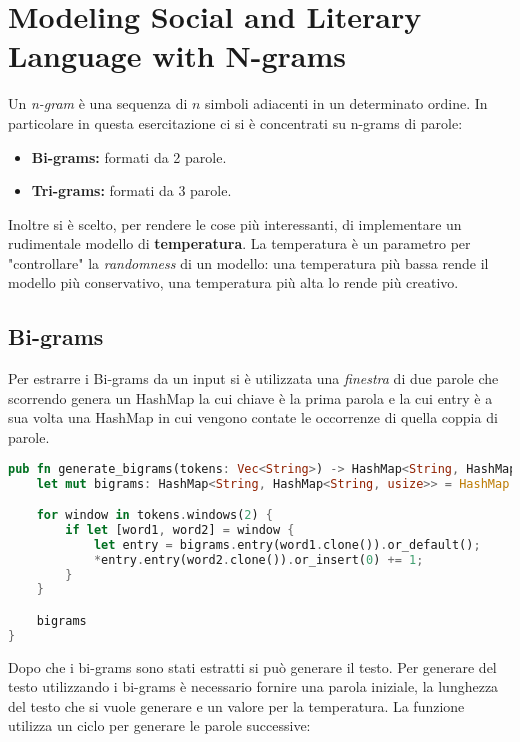 \chapter{Modeling Social and Literary Language with N-grams}

Un \textit{n-gram} è una sequenza di $n$ simboli adiacenti in un determinato ordine. In particolare in questa esercitazione ci si è concentrati su n-grams di parole:
\begin{itemize}
  \item \textbf{Bi-grams:} formati da 2 parole. 
  \item \textbf{Tri-grams:} formati da 3 parole.
\end{itemize}

Inoltre si è scelto, per rendere le cose più interessanti, di implementare un rudimentale modello di \textbf{temperatura}. La temperatura è un parametro per "controllare" la \textit{randomness} di un modello: una temperatura più bassa rende il modello più conservativo, una temperatura più alta lo rende più creativo.

\section{Bi-grams}

Per estrarre i Bi-grams da un input si è utilizzata una \textit{finestra} di due parole che scorrendo genera un HashMap la cui chiave è la prima parola e la cui entry è a sua volta una HashMap in cui vengono contate le occorrenze di quella coppia di parole.

\begin{lstlisting}[language=rust, caption = Estrazione dei bi-grams]
pub fn generate_bigrams(tokens: Vec<String>) -> HashMap<String, HashMap<String, usize>> {
    let mut bigrams: HashMap<String, HashMap<String, usize>> = HashMap::new();

    for window in tokens.windows(2) {
        if let [word1, word2] = window {
            let entry = bigrams.entry(word1.clone()).or_default();
            *entry.entry(word2.clone()).or_insert(0) += 1;
        }
    }

    bigrams
}
\end{lstlisting}

Dopo che i bi-grams sono stati estratti si può generare il testo. Per generare del testo utilizzando i bi-grams è necessario fornire una parola iniziale, la lunghezza del testo che si vuole generare e un valore per la temperatura. La funzione utilizza un ciclo per generare le parole successive:

